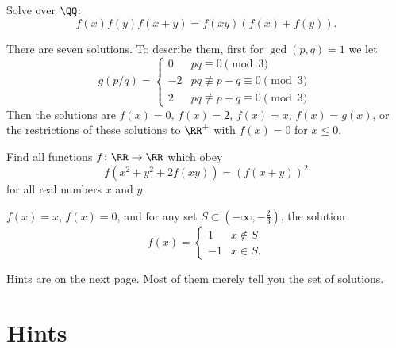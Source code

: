 \documentclass[11pt]{scrartcl}
\begin{document}
\begin{problem}
  \label{prob:sevensol}
  Solve over $\QQ$: \[ f(x)f(y)f(x+y) = f(xy)(f(x) + f(y)). \]
  \begin{hint}
    There are seven solutions. To describe them, first for $\gcd(p,q) = 1$ we let
    \[ g(p/q) =
      \begin{cases}
        0 & pq \equiv 0 \pmod 3 \\
        -2 & pq \not\equiv p-q \equiv 0 \pmod 3 \\
        2 & pq \not\equiv p+q \equiv 0 \pmod 3.
      \end{cases}
    \]
    Then the solutions are $f(x) = 0$, $f(x) = 2$, $f(x) = x$, $f(x) = g(x)$,
    or the restrictions of these solutions to $\RR^+$ with $f(x) = 0$ for $x \le 0$.
  \end{hint}
\end{problem}

\begin{problem}
  [Shortlist 2004 A6]
  \label{prob:SL2004A6}
  Find all functions $f\colon \RR \to \RR$ which obey
  \[ f(x^2+y^2+2f(xy)) = (f(x+y))^2 \]
  for all real numbers $x$ and $y$.
  \begin{hint}
    $f(x) = x$, $f(x) = 0$, and for any set $S \subset (-\infty, -\frac23)$, the solution
    \[
      f(x) =
      \begin{cases}
        1 & x \notin S \\
        -1 & x \in S.
      \end{cases}
    \]
  \end{hint}
\end{problem}

\vspace{2em}

\noindent Hints are on the next page.
Most of them merely tell you the set of solutions.

\eject

\section{Hints}
\makehints
\end{document}
